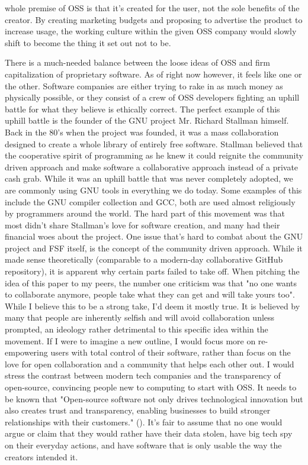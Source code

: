 \documentclass[11pt]{article}
\begin{document}
whole premise of OSS is that it's created for the user, not the sole benefits of the creator. By creating marketing budgets and proposing to advertise the product to increase usage, the working culture within the given OSS company would slowly shift to become the thing it set out not to be. 

There is a much-needed balance between the loose ideas of OSS and firm capitalization of proprietary software. As of right now however, it feels like one or the other. Software companies are either trying to rake in as much money as physically possible, or they consist of a crew of OSS developers fighting an uphill battle for what they believe is ethically correct. The perfect example of this uphill battle is the founder of the GNU project Mr. Richard Stallman himself. Back in the 80's when the project was founded, it was a mass collaboration designed to create a whole library of entirely free software. Stallman believed that the cooperative spirit of programming as he knew it could reignite the community driven approach and make software a collaborative approach instead of a private cash grab. While it was an uphill battle that was never completely adopted, we are commonly using GNU tools in everything we do today. Some examples of this include the GNU compiler collection and GCC, both are used almost religiously by programmers around the world. The hard part of this movement was that most didn't share Stallman’s love for software creation, and many had their financial woes about the project. One issue that's hard to combat about the GNU project and FSF itself, is the concept of the community driven approach. While it made sense theoretically (comparable to a modern-day collaborative GitHub repository), it is apparent why certain parts failed to take off. When pitching the idea of this paper to my peers, the number one criticism was that "no one wants to collaborate anymore, people take what they can get and will take yours too". While I believe this to be a strong take, I'd deem it mostly true. It is believed by many that people are inherently selfish and will avoid collaboration unless prompted, an ideology rather detrimental to this specific idea within the movement. If I were to imagine a new outline, I would focus more on re-empowering users with total control of their software, rather than focus on the love for open collaboration and a community that helps each other out. I would stress the contrast between modern tech companies and the transparency of open-source, convincing people new to computing to start with OSS. It needs to be known that "Open-source software not only drives technological innovation but also creates trust and transparency, enabling businesses to build stronger relationships with their customers." (\cite{ForbesOpenSourceBusinessModel}). It's fair to assume that no one would argue or claim that they would rather have their data stolen, have big tech spy on their everyday actions, and have software that is only usable the way the creators intended it. 
\end{document}
